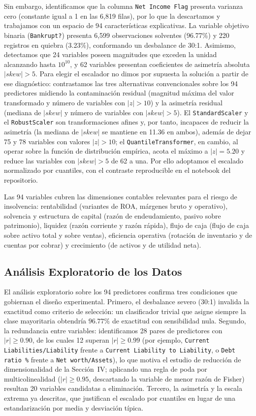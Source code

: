\documentclass[journal]{IEEEtran}
\begin{document}
Sin embargo, identificamos que la columna \texttt{Net Income Flag} presenta varianza cero (constante igual a 1 en las 6,819 filas), por lo que la descartamos y trabajamos con un espacio de 94 características explicativas. La variable objetivo binaria (\texttt{Bankrupt?}) presenta 6,599 observaciones solventes (96.77\%) y 220 registros en quiebra (3.23\%), conformando un desbalance de 30:1. Asimismo, detectamos que 24 variables poseen magnitudes que exceden la unidad alcanzando hasta $10^{10}$, y 62 variables presentan coeficientes de asimetría absoluta $|skew| > 5$. Para elegir el escalador no dimos por supuesta la solución a partir de ese diagnóstico: contrastamos las tres alternativas convencionales sobre los 94 predictores midiendo la contaminación residual (magnitud máxima del valor transformado y número de variables con $|z| > 10$) y la asimetría residual (mediana de $|skew|$ y número de variables con $|skew| > 5$). El \texttt{StandardScaler} y el \texttt{RobustScaler} son transformaciones afines y, por tanto, incapaces de reducir la asimetría (la mediana de $|skew|$ se mantiene en 11.36 en ambos), además de dejar 75 y 78 variables con valores $|z| > 10$; el \texttt{QuantileTransformer}, en cambio, al operar sobre la función de distribución empírica, acota el máximo a $|z| = 5.20$ y reduce las variables con $|skew| > 5$ de 62 a una. Por ello adoptamos el escalado normalizado por cuantiles, con el contraste reproducible en el notebook del repositorio.

Las 94 variables cubren las dimensiones contables relevantes para el riesgo de insolvencia: rentabilidad (variantes de ROA, márgenes bruto y operativo), solvencia y estructura de capital (razón de endeudamiento, pasivo sobre patrimonio), liquidez (razón corriente y razón rápida), flujo de caja (flujo de caja sobre activo total y sobre ventas), eficiencia operativa (rotación de inventario y de cuentas por cobrar) y crecimiento (de activos y de utilidad neta).

\subsection{Análisis Exploratorio de los Datos}
El análisis exploratorio sobre los 94 predictores confirma tres condiciones que gobiernan el diseño experimental. Primero, el desbalance severo (30:1) invalida la exactitud como criterio de selección: un clasificador trivial que asigne siempre la clase mayoritaria obtendría $96.77\%$ de exactitud con sensibilidad nula. Segundo, la redundancia entre variables: identificamos 28 pares de predictores con $|r| \ge 0.90$, de los cuales 12 superan $|r| \ge 0.99$ (por ejemplo, \texttt{Current Liabilities/Liability} frente a \texttt{Current Liability to Liability}, o \texttt{Debt ratio \%} frente a \texttt{Net worth/Assets}), lo que motiva el estudio de reducción de dimensionalidad de la Sección~IV; aplicando una regla de poda por multicolinealidad ($|r| \ge 0.95$, descartando la variable de menor razón de Fisher) resultan 20 variables candidatas a eliminación. Tercero, la asimetría y la escala extrema ya descritas, que justifican el escalado por cuantiles en lugar de una estandarización por media y desviación típica.
\end{document}
